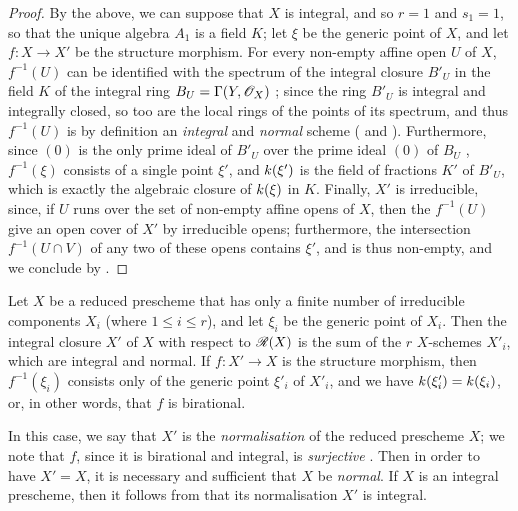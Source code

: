 \begin{proof}
By the above, we can suppose that $X$ is integral, and so $r=1$ and $s_1=1$, so that the unique algebra $A_1$ is a field $K$;
let $\xi$ be the generic point of $X$, and let $f:X\to X'$ be the structure morphism.
For every non-empty affine open $U$ of $X$, $f^{-1}(U)$ can be identified with the spectrum of the integral closure $B'_U$ in the field $K$ of the integral ring $B_U=\Gamma(Y,\mathscr{O}_X)$ ;
since the ring $B'_U$ is integral and integrally closed, so too are the local rings of the points of its spectrum, and thus $f^{-1}(U)$ is by definition an \emph{integral} and \emph{normal} scheme ( and ).
Furthermore, since $(0)$ is the only prime ideal of $B'_U$ over the prime ideal $(0)$ of $B_U$ \cite[t.~1, p.~259]{I-13}, $f^{-1}(\xi)$ consists of a single point $\xi'$, and $k(\xi')$ is the field of fractions $K'$ of $B'_U$, which is exactly the algebraic closure of $k(\xi)$ in $K$.
Finally, $X'$ is irreducible, since, if $U$ runs over the set of non-empty affine opens of $X$, then the $f^{-1}(U)$ give an open cover of $X'$ by irreducible opens;
furthermore, the intersection $f^{-1}(U\cap V)$ of any two of these opens contains $\xi'$, and is thus non-empty, and we conclude by .
\end{proof}

\begin{corollary}[6.3.8]
\label{II.6.3.8}
Let $X$ be a reduced prescheme that has only a finite number of irreducible components $X_i$ (where $1\leq i\leq r$), and let $\xi_i$ be the generic point of $X_i$.
Then the integral closure $X'$ of $X$ with respect to $\mathscr{R}(X)$ is the sum of the $r$ $X$-schemes $X'_i$, which are integral and normal.
If $f:X'\to X$ is the structure morphism, then $f^{-1}(\xi_i)$ consists only of the generic point $\xi'_i$ of $X'_i$, and we have $k(\xi'_i)=k(\xi_i)$, or, in other words, that $f$ is birational.
\end{corollary}

In this case, we say that $X'$ is the \emph{normalisation} of the reduced prescheme $X$;
we note that $f$, since it is birational and integral, is \emph{surjective} .
Then in order to have $X'=X$, it is necessary and sufficient that $X$ be \emph{normal}.
If $X$ is an integral prescheme, then it follows from  that its normalisation $X'$ is integral.

